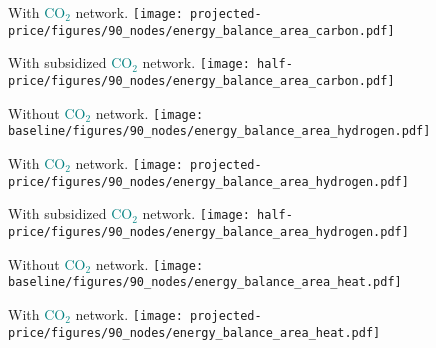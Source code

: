 \documentclass[12pt, aspectratio=169]{beamer}
\newcommand{\carbon}{\textcolor{teal}{CO$_2$}}
\begin{document}
\begin{frame}
    \begin{center}
    With \carbon{} network.
    \texttt{[image: projected-price/figures/90\_nodes/energy\_balance\_area\_carbon.pdf]}
    \end{center}
\end{frame}


\begin{frame}
    \begin{center}
    With subsidized \carbon{} network.
    \texttt{[image: half-price/figures/90\_nodes/energy\_balance\_area\_carbon.pdf]}
    \end{center}
\end{frame}


\begin{frame}
    \begin{center}
    Without \carbon{} network.
    \texttt{[image: baseline/figures/90\_nodes/energy\_balance\_area\_hydrogen.pdf]}
    \end{center}
\end{frame}


\begin{frame}
    \begin{center}
    With \carbon{} network.
    \texttt{[image: projected-price/figures/90\_nodes/energy\_balance\_area\_hydrogen.pdf]}
    \end{center}
\end{frame}


\begin{frame}
    \begin{center}
    With subsidized \carbon{} network.
    \texttt{[image: half-price/figures/90\_nodes/energy\_balance\_area\_hydrogen.pdf]}
    \end{center}
\end{frame}


\begin{frame}
    \begin{center}
    Without \carbon{} network.
    \texttt{[image: baseline/figures/90\_nodes/energy\_balance\_area\_heat.pdf]}
    \end{center}
\end{frame}


\begin{frame}
    \begin{center}
    With \carbon{} network.
    \texttt{[image: projected-price/figures/90\_nodes/energy\_balance\_area\_heat.pdf]}
    \end{center}
\end{frame}
\end{document}
